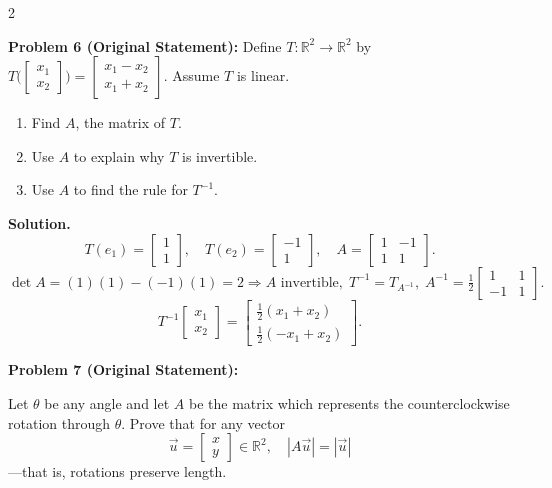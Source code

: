 \documentclass[8pt]{extarticle}
\begin{document}
\begin{multicols}{2}
\begin{tcolorbox}[title=]
\noindent
\textbf{Problem 6 (Original Statement):}
Define \(T:\mathbb{R}^{2}\to\mathbb{R}^{2}\) by
\(
T\big(\begin{bmatrix}x_{1}\\x_{2}\end{bmatrix}\big)
=\begin{bmatrix}x_{1}-x_{2}\\x_{1}+x_{2}\end{bmatrix}.
\)
Assume \(T\) is linear.
\begin{enumerate}
\item[(a)] Find \(A\), the matrix of \(T\).
\item[(b)] Use \(A\) to explain why \(T\) is invertible.
\item[(c)] Use \(A\) to find the rule for \(T^{-1}\).
\end{enumerate}

\textbf{Solution.}
\[
T(e_{1})=\begin{bmatrix}1\\1\end{bmatrix},\quad
T(e_{2})=\begin{bmatrix}-1\\1\end{bmatrix},\quad
A=\begin{bmatrix}1&-1\\1&1\end{bmatrix}.
\]
\[
\det A=(1)(1)-(-1)(1)=2\Rightarrow A\text{ invertible},\;
T^{-1}=T_{A^{-1}},\;
A^{-1}=\tfrac12\begin{bmatrix}1&1\\-1&1\end{bmatrix}.
\]
\[
T^{-1}\!\begin{bmatrix}x_{1}\\x_{2}\end{bmatrix}
=\begin{bmatrix}\tfrac12(x_{1}+x_{2})\\[2pt]\tfrac12(-x_{1}+x_{2})\end{bmatrix}.
\]
\end{tcolorbox}

\begin{tcolorbox}[title=]
\noindent
\textbf{Problem 7 (Original Statement):}  

Let \(\theta\) be any angle and let \(A\) be the matrix which represents the counterclockwise rotation through \(\theta\).  
Prove that for any vector
\[
\vec{u} =
\begin{bmatrix} x\\ y \end{bmatrix} \in \mathbb{R}^{2},
\quad
|A\vec{u}| = |\vec{u}|
\]
—that is, rotations preserve length.


\end{tcolorbox}
\end{multicols}
\end{document}
